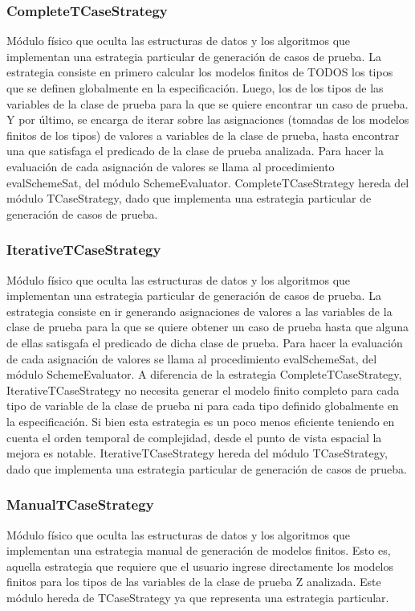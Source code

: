 \documentclass[a4paper,10pt]{report}
\begin{document}
			\subsubsection{CompleteTCaseStrategy}
			Módulo físico que oculta las estructuras de datos y los algoritmos que implementan una estrategia particular de generación de casos de prueba. La estrategia consiste en primero calcular los modelos finitos de TODOS los tipos que se definen globalmente en la especificación. Luego, los de los tipos de las variables de la clase de prueba para la que se quiere encontrar un caso de prueba. Y por último, se encarga de iterar sobre las asignaciones (tomadas de los modelos finitos de los tipos) de valores a variables de la clase de prueba, hasta encontrar una que satisfaga el predicado de la clase de prueba analizada. Para hacer la evaluación de cada asignación de valores se llama al procedimiento evalSchemeSat, del módulo SchemeEvaluator. CompleteTCaseStrategy hereda del módulo TCaseStrategy, dado que implementa una estrategia particular de generación de casos de prueba.
			\subsubsection{IterativeTCaseStrategy}
			Módulo físico que oculta las estructuras de datos y los algoritmos que implementan una estrategia particular de generación de casos de prueba. La estrategia consiste en ir generando asignaciones de valores a las variables de la clase de prueba para la que se quiere obtener un caso de prueba hasta que alguna de ellas satisgafa el predicado de dicha clase de prueba. Para hacer la evaluación de cada asignación de valores se llama al procedimiento evalSchemeSat, del módulo SchemeEvaluator. A diferencia de la estrategia CompleteTCaseStrategy, IterativeTCaseStrategy no necesita generar el modelo finito completo para cada tipo de variable de la clase de prueba ni para cada tipo definido globalmente en la especificación. Si bien esta estrategia es un poco menos eficiente teniendo en cuenta el orden temporal de complejidad, desde el punto de vista espacial la mejora es notable. IterativeTCaseStrategy hereda del módulo TCaseStrategy, dado que implementa una estrategia particular de generación de casos de prueba.
			\subsubsection{ManualTCaseStrategy} 
			Módulo físico que oculta las estructuras de datos y los algoritmos que implementan una estrategia manual de generación de modelos finitos. Esto es, aquella estrategia que requiere que el usuario ingrese directamente los modelos finitos para los tipos de las variables de la clase de prueba Z analizada. Este módulo hereda de TCaseStrategy ya que representa una estrategia particular.
\end{document}
